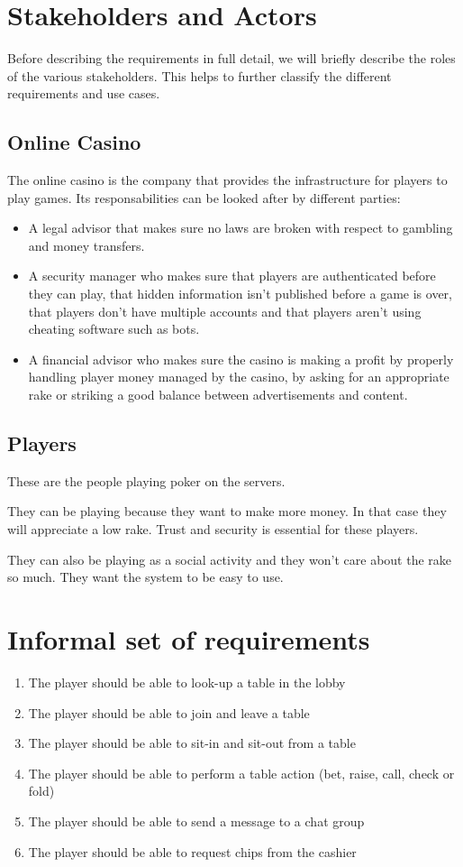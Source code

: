 \documentclass[a4paper,11pt]{report}
\begin{document}
\section{Stakeholders and Actors}
Before  describing the requirements in full detail, we will briefly describe the roles of  the  various 
stakeholders. This helps to further classify the different requirements and use cases.

\subsection{Online Casino}
The online casino is the company that provides the infrastructure for players to play games. Its responsabilities can be looked after by different parties:
\begin{itemize}
 \item A legal advisor that makes sure no laws are broken with respect to gambling and money transfers.
 \item A security manager who makes sure that players are authenticated before they can play, that hidden information isn't published before a game is over, that players don't have multiple accounts and that players aren't using cheating software such as bots.
 \item A financial advisor who makes sure the casino is making a profit by properly handling player money managed by the casino, by asking for an appropriate rake or striking a good balance between advertisements and content.
\end{itemize}


\subsection{Players}
These are the people playing poker on the servers. 

They can be playing because they want to make more money. In that case they will appreciate a low rake. Trust and security is essential for these players.

They can also be playing as a social activity and they won't care about the rake so much. They want the system to be easy to use.

\section{Informal set of requirements}
\begin{enumerate}
\item The player should be able to look-up a table in the lobby
\item The player should be able to join and leave a table
\item The player should be able to sit-in and sit-out from a table
\item The player should be able to perform a table action (bet, raise, call, check or fold)
\item The player should be able to send a message to a chat group
\item The player should be able to request chips from the cashier
\end{enumerate}
\end{document}
